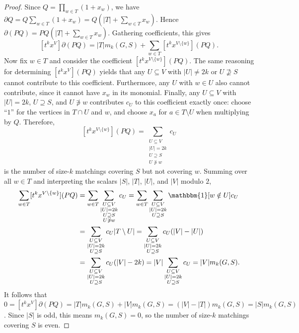 \documentclass{amsart}
\theoremstyle{definition}
\theoremstyle{remark}
\begin{document}
\begin{proof}
    Since $Q = \prod_{w\in T}(1+x_w)$, we have $\partial Q  = Q\sum_{w\in T}(1+x_w) = Q(|T| + \sum_{w\in T}x_w)$. Hence $\partial  (P Q) = P Q(|T| + \sum_{w\in T}x_w)$. Gathering coefficients, this gives
    \[
        [t^kx^V]\partial(P Q) = |T|m_k(G, S) + \sum_{w\in T}[t^kx^{V\setminus\{w\}}](P Q).
    \]
    Now fix $w\in T$ and consider the coefficient $[t^kx^{V\setminus\{w\}}](PQ)$. The same reasoning for determining $[t^k x^V](PQ)$ yields that any $U\subseteq V$ with $|U| \neq 2k$ or $U\not\supseteq S$ cannot contribute to this coefficient. Furthermore, any $U$ with $w\in U$ also cannot contribute, since it cannot have $x_w$ in its monomial. Finally, any $U\subseteq V$ with $|U|=2k$, $U\supseteq S$, and $U\not\ni w$ contributes $c_U$ to this coefficient exactly once: choose ``$1$'' for the vertices in $T\cap U$ and $w$, and choose $x_a$ for $a\in T\setminus U$ when multiplying by $Q$. Therefore, 
    \[
        [t^kx^{V\setminus\{w\}}](P Q) = \sum_{\substack{U\subseteq V\\|U|=2k\\U\supseteq S\\U\not\ni w}} c_U
    \]
    is the number of size-$k$ matchings covering $S$ but not covering $w$. Summing over all $w\in T$ and interpreting the scalars $|S|$, $|T|$, $|U|$, and $|V|$ modulo $2$,
        \begin{align*}
        \sum_{w\in T}[t^kx^{V\setminus\{w\}}](P Q) &= \sum_{w\in T}\sum_{\substack{U\subseteq V\\|U|=2k\\U\supseteq S\\U\not\ni w}} c_U = \sum_{w\in T}\sum_{\substack{U\subseteq V\\|U|=2k\\U\supseteq S}} \mathbbm{1}[w\notin U]c_U\\
        &= \sum_{\substack{U\subseteq V\\|U|=2k\\U\supseteq S}}c_U|T\setminus U| = \sum_{\substack{U\subseteq V\\|U|=2k\\U\supseteq S}}c_U(|V|-|U|)\\
        &= \sum_{\substack{U\subseteq V\\|U|=2k\\U\supseteq S}}c_U(|V|-2k) = |V|\sum_{\substack{U\subseteq V\\|U|=2k\\U\supseteq S}}c_U = |V|m_k(G, S).
    \end{align*}
    It follows that $0 = [t^kx^V]\partial(P Q) = |T|m_k(G, S) + |V|m_k(G, S) = (|V|-|T|)m_k(G,S) = |S|m_k(G,S)$. Since $|S|$ is odd, this means $m_k(G,S) = 0$, so the number of size-$k$ matchings covering $S$ is even.
\end{proof}
\end{document}
